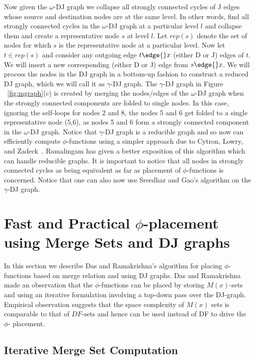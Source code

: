 Now given  the $\omega$-DJ graph we collapse all strongly connected cycles of J edges whose
source and destination nodes are at the same level. In other words, find all
strongly connected cycles in the $\omega$-DJ graph at a particular level $l$  and 
collapse them and create a representative  node $s$ at level $l$. 
Let $rep(s)$ denote the set of nodes for which $s$ is the representative node at a 
particular level. Now let $t \in rep(s)$ and consider any outgoing edge
$t \edge{} x$  (either D or J) edges
of $t$. We will insert a new corresponding
(either D or J) edge from $s \edge{} x$. We will process the nodes in the DJ graph
in a bottom-up fashion to construct a reduced DJ graph, which we will call it
as $\gamma$-DJ graph. The $\gamma$-DJ graph in
Figure ~\ref{fig:mgraph}(c) is created by merging the nodes/edges of the $\omega$-DJ graph
when the strongly connected components are folded to single nodes. 
In this case, ignoring the
self-loops for nodes 2 and 8, the nodes 5 and 6 get folded to a single representative 
node (5,6), as nodes
5 and 6 form a strongly connected component in the $\omega$-DJ graph.
Notice that $\gamma$-DJ graph is a reducible graph and so now can efficiently compute
$\phi$-functions using a simpler approach due to Cytron, Lowry, and Zadeck~\cite{xx}.
Ramalingam has given a better exposition of this algorithm which can handle 
reducible graphs. 
 It is important to notice that all nodes in strongly
connected cycles as being equivalent as far as placement of $\phi$-functions is concerned.
Notice that one can also now use Sreedhar and Gao's algorithm on the $\gamma$-DJ graph.


\section{Fast and Practical $\phi$-placement using Merge Sets and DJ graphs}

In this section we describe Das and Ramakrishna's algorithm for placing $\phi$-functions
based on merge relation and using DJ graphs. 
Das and Ramakrishna  made an observation that the $\phi$-functions can be
placed by storing $M(x)$-sets and using
an iterative formulation involving a top-down pass over the DJ-graph.
Empirical observation
suggests that the space complexity of $M(x)$ sets is comparable to that of $DF$-sets
and hence can be used instead of DF to drive the $\phi$- placement.



\subsection{Iterative Merge Set Computation}

